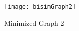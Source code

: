 \begin{figure}[h!]
\centering
\texttt{[image: bisimGraph2]}
\caption{Minimized Graph 2}
\label{fig:bisimGraph2}
\end{figure}

